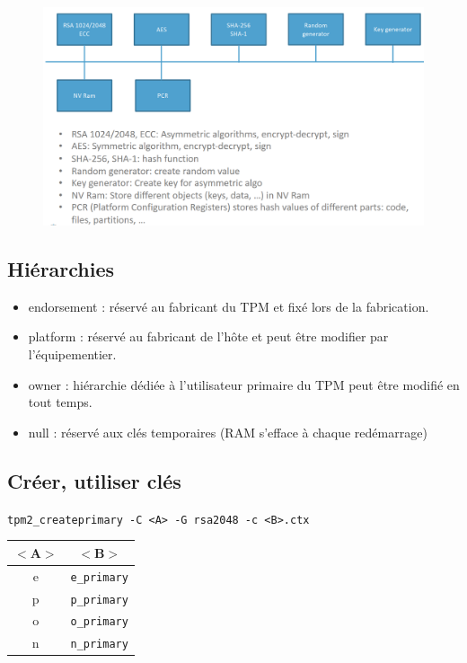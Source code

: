 \documentclass[resume]{subfiles}
\begin{document}
\begin{figure}[H]
    \centering
    \includegraphics[width=\columnwidth]{Figures/TPM/internal.png}
\end{figure}

\subsection{Hiérarchies}
\begin{itemize}
\item endorsement : réservé au fabricant du TPM et fixé lors de la fabrication.
\item platform : réservé au fabricant de l'hôte et peut être modifier par l'équipementier.
\item owner : hiérarchie dédiée à l'utilisateur primaire du TPM peut être modifié en tout temps.
\item null : réservé aux clés temporaires (RAM s'efface à chaque redémarrage)
\end{itemize}

\subsection{Créer, utiliser clés}
\begin{center}
\verb!tpm2_createprimary -C <A> -G rsa2048 -c <B>.ctx!\\
\begin{tabular}{cc}
$<$A$>$ & $<$B$>$ \\\hline
e & \verb!e_primary!\\
p & \verb!p_primary!\\
o & \verb!o_primary!\\
n & \verb!n_primary!
\end{tabular}
\end{center}
\end{document}
